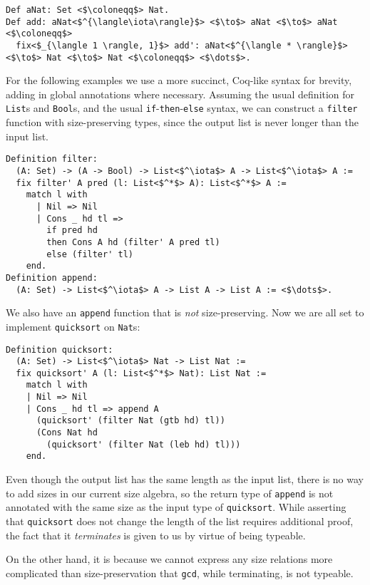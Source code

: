 \documentclass[sigplan,10pt,anonymous,review]{acmart}
\begin{document}
\begin{verbatim}
Def aNat: Set <$\coloneqq$> Nat.
Def add: aNat<$^{\langle\iota\rangle}$> <$\to$> aNat <$\to$> aNat <$\coloneqq$>
  fix<$_{\langle 1 \rangle, 1}$> add': aNat<$^{\langle * \rangle}$> <$\to$> Nat <$\to$> Nat <$\coloneqq$> <$\dots$>.
\end{verbatim}

For the following examples we use a more succinct, Coq-like syntax for brevity, adding in global annotations where necessary. Assuming the usual definition for \texttt{List}s and \texttt{Bool}s, and the usual \texttt{if}-\texttt{then}-\texttt{else} syntax, we can construct a \texttt{filter} function with size-preserving types, since the output list is never longer than the input list.

\begin{verbatim}
Definition filter:
  (A: Set) -> (A -> Bool) -> List<$^\iota$> A -> List<$^\iota$> A :=
  fix filter' A pred (l: List<$^*$> A): List<$^*$> A :=
    match l with
      | Nil => Nil
      | Cons _ hd tl =>
        if pred hd
        then Cons A hd (filter' A pred tl)
        else (filter' tl)
    end.
Definition append:
  (A: Set) -> List<$^\iota$> A -> List A -> List A := <$\dots$>.
\end{verbatim}

We also have an \texttt{append} function that is \textit{not} size-preserving. Now we are all set to implement \texttt{quicksort} on \texttt{Nat}s:

\begin{verbatim}
Definition quicksort:
  (A: Set) -> List<$^\iota$> Nat -> List Nat :=
  fix quicksort' A (l: List<$^*$> Nat): List Nat :=
    match l with
    | Nil => Nil
    | Cons _ hd tl => append A
      (quicksort' (filter Nat (gtb hd) tl))
      (Cons Nat hd
        (quicksort' (filter Nat (leb hd) tl)))
    end.
\end{verbatim}
Even though the output list has the same length as the input list, there is no way to add sizes in our current size algebra, so the return type of \texttt{append} is not annotated with the same size as the input type of \texttt{quicksort}. While asserting that \texttt{quicksort} does not change the length of the list requires additional proof, the fact that it \textit{terminates} is given to us by virtue of being typeable.

On the other hand, it is because we cannot express any size relations more complicated than size-preservation that \texttt{gcd}, while terminating, is not typeable.
\end{document}
